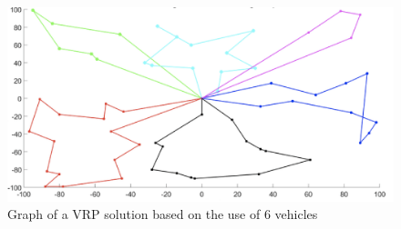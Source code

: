 \begin{figure}[h]
    \centering
    \includegraphics[width=1.0\textwidth]{images/vrp-graph.png}
    \caption{Graph of a VRP solution based on the use of 6 vehicles}
    \label{fig:mesh1}
\end{figure}
